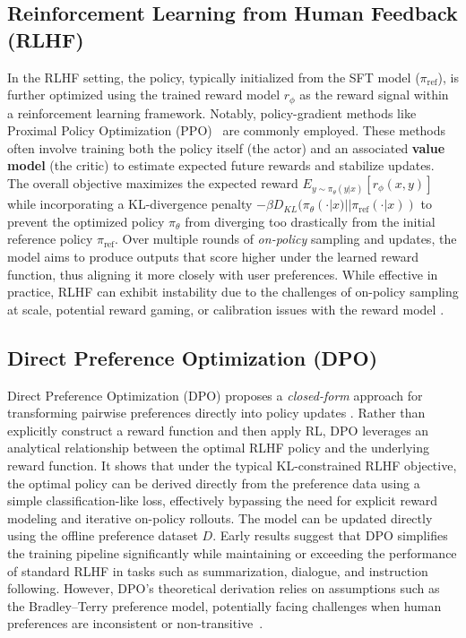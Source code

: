 \documentclass[a4paper,oneside,10pt,ngerman,english]{scrartcl}
\begin{document}
\subsection{Reinforcement Learning from Human Feedback (RLHF)}
\label{sec:rlhf-pipeline}
In the RLHF setting, the policy, typically initialized from the SFT model ($\pi_{\text{ref}}$), is further optimized using the
trained reward model $r_\phi$ as the reward signal within a reinforcement learning framework. Notably, policy-gradient methods like Proximal Policy Optimization (PPO)~\cite{bib:Schulman2017} are commonly employed. These methods often involve training both the policy itself (the actor) and an associated \textbf{value model} (the critic) to estimate expected future rewards and stabilize updates. The overall objective maximizes the expected reward $E_{y \sim \pi_\theta(y|x)}[r_\phi(x,y)]$ while incorporating a KL-divergence penalty $-\beta D_{KL}(\pi_\theta(\cdot|x) || \pi_{\text{ref}}(\cdot|x))$ to prevent the optimized policy $\pi_\theta$ from diverging too drastically from the initial reference policy $\pi_{\text{ref}}$. Over multiple rounds of
\emph{on-policy} sampling and updates, the model aims to produce outputs that score higher
under the learned reward function, thus aligning it more closely with user preferences. While
effective in practice, RLHF can exhibit instability due to the challenges of on-policy sampling at scale, potential reward
gaming, or calibration issues with the reward model \cite{bib:gao2023scaling}.

\subsection{Direct Preference Optimization (DPO)}
\label{sec:background-dpo}
Direct Preference Optimization (DPO) proposes a \emph{closed-form} approach for transforming
pairwise preferences directly into policy updates \cite{bib:rafailov2023direct}. Rather than explicitly
construct a reward function and then apply RL, DPO leverages an analytical relationship between the optimal RLHF policy and the underlying reward function. It shows that under the typical KL-constrained RLHF objective, the optimal policy can be derived directly from the preference data using a simple classification-like loss, effectively bypassing the need for explicit reward modeling and iterative on-policy rollouts.
The model can be updated directly using the offline preference dataset $D$. Early results
suggest that DPO simplifies the training pipeline significantly while maintaining or exceeding
the performance of standard RLHF in tasks such as summarization, dialogue, and instruction
following. However, DPO’s theoretical derivation relies on assumptions such as the
Bradley--Terry preference model, potentially facing challenges when human preferences are inconsistent or non-transitive~\cite{bib:Tversky1969}.
\end{document}
